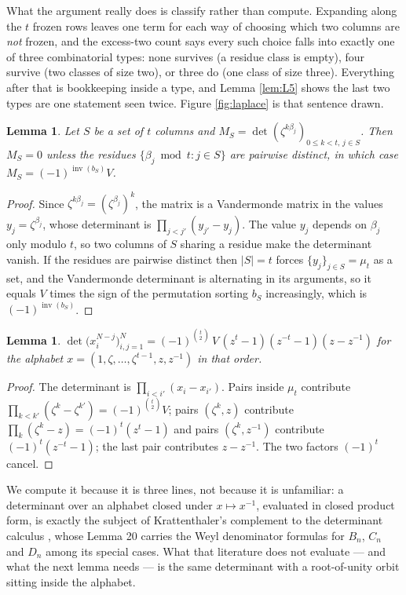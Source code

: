 \documentclass[11pt,reqno]{amsart}
\theoremstyle{plain}
\newtheorem{lemma}[theorem]{Lemma}
\theoremstyle{definition}
\newcommand{\zt}{\mu_t}
\newcommand{\inv}{\operatorname{inv}}
\begin{document}
What the argument really does is classify rather than compute. Expanding along the $t$ frozen rows
leaves one term for each way of choosing which two columns are \emph{not} frozen, and the excess-two
count says every such choice falls into exactly one of three combinatorial types: none survives
(a residue class is empty), four survive (two classes of size two), or three do (one class of size
three). Everything after that is bookkeeping inside a type, and Lemma \ref{lem:L5} shows the last two
types are one statement seen twice. Figure \ref{fig:laplace} is that sentence drawn.

\begin{lemma}\label{lem:L1}
Let $S$ be a set of $t$ columns and $M_S=\det(\zeta^{k\beta_j})_{0\le k<t,\,j\in S}$. Then $M_S=0$
unless the residues $\{\beta_j\bmod t:j\in S\}$ are pairwise distinct, in which case
$M_S=(-1)^{\inv(b_S)}V$.
\end{lemma}

\begin{proof}
Since $\zeta^{k\beta_j}=(\zeta^{\beta_j})^k$, the matrix is a Vandermonde matrix in the values
$y_j=\zeta^{\beta_j}$, whose determinant is $\prod_{j<j'}(y_{j'}-y_j)$. The value $y_j$ depends on
$\beta_j$ only modulo $t$, so two columns of $S$ sharing a residue make the determinant vanish. If
the residues are pairwise distinct then $|S|=t$ forces $\{y_j\}_{j\in S}=\zt$ as a set, and the
Vandermonde determinant is alternating in its arguments, so it equals $V$ times the sign of the
permutation sorting $b_S$ increasingly, which is $(-1)^{\inv(b_S)}$.
\end{proof}

\begin{lemma}\label{lem:L2}
$\det\bigl(x_i^{N-j}\bigr)_{i,j=1}^{N}
=(-1)^{\binom t2}\,V\,(z^t-1)(z^{-t}-1)(z-z^{-1})$ for the alphabet
$x=(1,\zeta,\dots,\zeta^{t-1},z,z^{-1})$ in that order.
\end{lemma}

\begin{proof}
The determinant is $\prod_{i<i'}(x_i-x_{i'})$. Pairs inside $\zt$ contribute
$\prod_{k<k'}(\zeta^k-\zeta^{k'})=(-1)^{\binom t2}V$; pairs $(\zeta^k,z)$ contribute
$\prod_k(\zeta^k-z)=(-1)^t(z^t-1)$ and pairs $(\zeta^k,z^{-1})$ contribute $(-1)^t(z^{-t}-1)$; the
last pair contributes $z-z^{-1}$. The two factors $(-1)^t$ cancel.
\end{proof}

\noindent We compute it because it is three lines, not because it is unfamiliar: a determinant over
an alphabet closed under $x\mapsto x^{-1}$, evaluated in closed product form, is exactly the subject
of Krattenthaler's complement to the determinant calculus \cite[\S5.11]{KratADCC}, whose Lemma 20
carries the Weyl denominator formulas for $B_n$, $C_n$ and $D_n$ among its special cases. What that
literature does not evaluate --- and what the next lemma needs --- is the same determinant with a
root-of-unity orbit sitting inside the alphabet.
\end{document}
